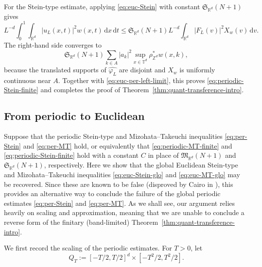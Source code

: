 \documentclass[11pt,reqno]{amsart}
\numberwithin{equation}{section}
\newcommand{\dd}{\,\mathrm{d}}
\renewcommand{\leq}{\leqslant}
\begin{document}
For the Stein-type estimate, applying \eqref{eq:euc-Stein} with constant $\mathfrak{S}_{\mathbb{R}^d}(N+1)$ gives
\[ L^{-d}\int_0^1\int_{\mathbb{R}^d}|u_L(x,t)|^2w(x,t)\dd x\dd t
\leq \mathfrak{S}_{\mathbb{R}^d}(N+1)L^{-d}\int_{\mathbb{R}^d}|F_L(v)|^2X_w(v)\dd v. \]
The right-hand side converges to
\[ \mathfrak{S}_{\mathbb{R}^d}(N+1)
\sum_{k\in A}|a_k|^2\sup_{x\in\mathbb{T}^d}\rho^{\ast}_{\mathbb{Z}^d}w(x,k), \]
because the translated supports of $\widehat{\varphi_L}$ are disjoint and $X_w$ is uniformly continuous near $A$. Together with \eqref{eq:euc-per-left-limit}, this proves \eqref{eq:periodic-Stein-finite} and completes the proof of Theorem~\ref{thm:quant-transference-intro}.

\subsection{From periodic to Euclidean}\label{Sect:pertoEuc}
Suppose that the periodic Stein-type and Mizohata--Takeuchi inequalities \eqref{eq:per-Stein} and \eqref{eq:per-MT} hold, or equivalently that  \eqref{eq:periodic-MT-finite} and \eqref{eq:periodic-Stein-finite} hold with a constant $C$ in place of $\mathfrak{M}_{\mathbb{R}^d}(N+1)$ and $\mathfrak{S}_{\mathbb{R}^d}(N+1)$, respectively. Here we show that the global Euclidean Stein-type and Mizohata--Takeuchi inequalities \eqref{eq:euc-Stein-glo} and \eqref{eq:euc-MT-glo} may be recovered. Since these are known to be false (disproved by Cairo in \cite{Cairo}), this provides an alternative way to conclude the failure of the global periodic estimates \eqref{eq:per-Stein} and \eqref{eq:per-MT}. As we shall see, our argument relies heavily on scaling and approximation, meaning that we are unable to conclude a reverse form of the finitary (band-limited) Theorem~\ref{thm:quant-transference-intro}. 

We first record the scaling of the periodic estimates. For $T>0$, let
\[ Q_T:=[-T/2,T/2]^d\times[-T^2/2,T^2/2]. \]
\end{document}
